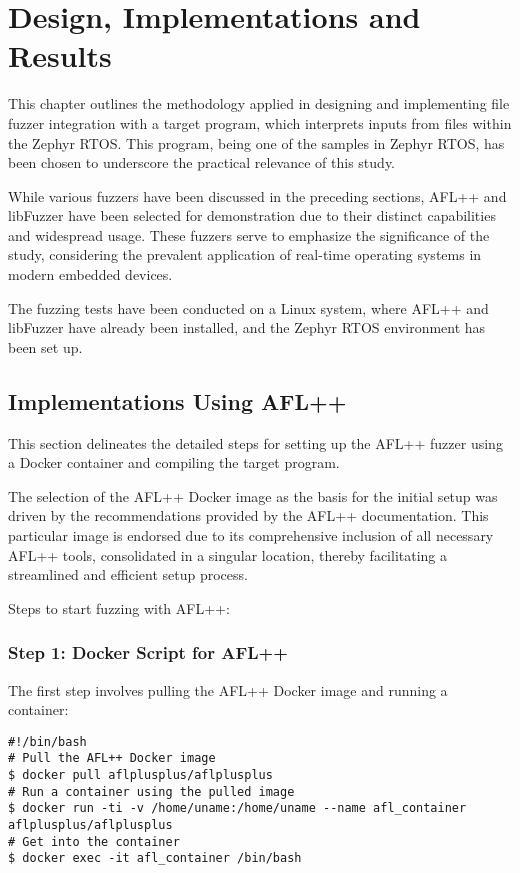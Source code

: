 \vspace{21.5pt}
\chapter{Design, Implementations and Results}

This chapter outlines the methodology applied in designing and implementing
file fuzzer integration with a target program, which interprets inputs from
files within the Zephyr RTOS. This program, being one of the samples in
Zephyr RTOS\cite{Security75:online}, has been chosen to underscore the
practical relevance of this study.

While various fuzzers have been discussed in the preceding sections,
AFL++\cite{257204} and libFuzzer\cite{libFuzze17:online} have been selected for demonstration due to their distinct
capabilities and widespread usage. These fuzzers serve to emphasize the
significance of the study, considering the prevalent application of
real-time operating systems in modern embedded devices.

The fuzzing tests have been conducted on a Linux system,
where AFL++\cite{257204} and libFuzzer\cite{libFuzze17:online} have already been installed, and the Zephyr RTOS environment has been set up.

\section{Implementations Using AFL++}
This section delineates the detailed steps for setting up the
AFL++\cite{257204} fuzzer using a Docker\cite{anderson2015docker}
container and compiling the target program.

The selection of the AFL++ Docker image as the basis for the initial setup was
driven by the recommendations provided by the AFL++ documentation. This particular
image is endorsed due to its comprehensive inclusion of all necessary AFL++ tools,
consolidated in a singular location, thereby facilitating a streamlined
and efficient setup process\cite{257204}.

Steps to start fuzzing with AFL++:

\subsection*{Step 1: Docker Script for AFL++}
The first step involves pulling the AFL++ Docker image and running a container:
\begin{verbatim}
#!/bin/bash
# Pull the AFL++ Docker image
$ docker pull aflplusplus/aflplusplus
# Run a container using the pulled image
$ docker run -ti -v /home/uname:/home/uname --name afl_container aflplusplus/aflplusplus
# Get into the container
$ docker exec -it afl_container /bin/bash
\end{verbatim}

